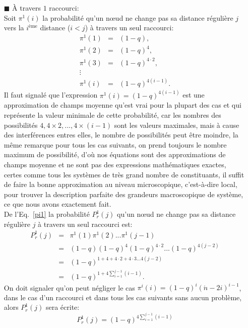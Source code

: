 \begin{itemize}
\item[$\blacksquare$]  \`{A} travers $1$ raccourci:\\
Soit $\pi^1(i)$ la probabilité qu'un nœud ne change pas sa distance régulière $j$ vers
la $i^{\text{ème}}$ distance ($i<j$) à travers un seul raccourci:
\begin{eqnarray}\nonumber
	\pi^1(1)&=&(1-q), \\\nonumber
	\pi^1(2)&=&(1-q)^4,\\\nonumber
	\pi^1(3)&=&(1-q)^{4\cdot2},\\\nonumber
	\vdots\\
	\pi^1(i)&=&(1-q)^{4(i-1)}.
	\label{pi1}
	\end{eqnarray}
	Il faut signalé que l'expression $\pi^1(i)=(1-q)^{4(i-1)}$ est une approximation de champs moyenne qu'est vrai pour la plupart des cas et qui représente la valeur minimale de cette probabilité, car les nombres des possibilités
	$4,4\times2,...,4\times(i-1)$ sont les valeurs maximales, mais à cause des interférences entres elles, le nombre de possibilités peut être moindre, la m\^{e}me remarque pour tous les cas 
	suivants, on prend toujours le nombre maximum de possibilité, d'où nos équations sont des approximations de champs moyenne et ne sont pas des expressions 
	mathématiques exactes, certes comme tous les systèmes de très grand nombre de constituants, il suffit de faire la bonne 
	approximation au niveau microscopique, c'est-à-dire local, pour trouver la description parfaite des grandeurs macroscopique de système, ce que nous
	avons exactement fait.\\
	De l'Eq.~\eqref{pi1} la probabilité $P^1_r(j)$ qu'un nœud ne change pas sa distance régulière $j$ à travers un seul raccourci est:
	\begin{eqnarray}\nonumber
	P_r^1(j)&=&\pi^1(1)\pi^1(2)...\pi^1(j-1)\\\nonumber
	&=& (1-q)(1-q)^4(1-q)^{4\cdot2}...(1-q)^{4(j-2)}\\\nonumber
	&=&(1-q)^{1+4+4\cdot2+4\cdot3...4(j-2)}\\\nonumber
	&=&(1-q)^{1+4\sum_{i=1}^{j-1}(i-1)}.
	\end{eqnarray}
	On doit signaler qu'on peut négliger le cas $\pi^i(i)=(1-q)^{i}(\acute{n}-2i)^{i-1}$,  dans le cas d'un raccourci et dans tous les cas suivants sans aucun problème, alors $P_r^1(j)$ sera écrite:
	$$P_r^1(j)=(1-q)^{4\sum_{i=1}^{j-1}(i-1)}$$
	

\end{itemize}

